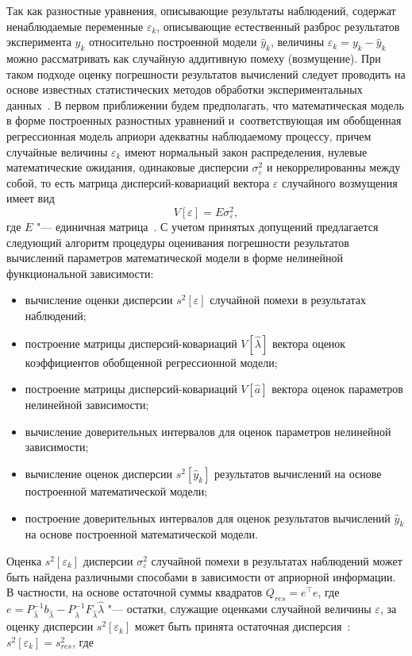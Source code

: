 Так как разностные уравнения, описывающие результаты наблюдений, содержат ненаблюдаемые переменные $\varepsilon_k$, описывающие естественный разброс результатов эксперимента $y_k$ относительно построенной модели $\hat{y}_k$,  величины $\varepsilon_k=y_k-\hat{y}_k$ можно рассматривать как случайную аддитивную помеху (возмущение). При таком подходе оценку погрешности результатов вычислений следует проводить на основе известных статистических методов обработки экспериментальных данных~\cite{zot:1,zot:2,zot:3}. В первом приближении будем предполагать, что математическая модель в форме построенных разностных уравнений и~соответствующая им обобщенная регрессионная модель априори адекватны наблюдаемому процессу, причем случайные величины $\varepsilon_k$ имеют нормальный закон распределения, нулевые математические ожидания, одинаковые дисперсии $\sigma_\varepsilon^2$ и некоррелированны между собой, то есть матрица дисперсий-ковариаций вектора $\varepsilon$ случайного возмущения имеет вид $$V[\varepsilon]=E\sigma_\varepsilon^2,$$ 
где   $E$ "--- единичная матрица~\cite{zot:1}. С учетом принятых допущений предлагается следующий алгоритм процедуры оценивания погрешности результатов вычислений параметров математической модели в форме нелинейной функциональной зависимости:

\begin{itemize}
\item 	вычисление оценки дисперсии $s^2[\varepsilon]$ случайной помехи в результатах наблюдений;
\item 	построение матрицы дисперсий-ковариаций $V[\hat{\lambda}]$ вектора оценок коэффициентов обобщенной регрессионной модели;
\item 	построение матрицы дисперсий-ковариаций $V[\hat{a}]$  вектора оценок параметров нелинейной зависимости;
\item	вычисление доверительных интервалов для оценок параметров нелинейной зависимости;
\item	вычисление оценок дисперсии $s^2[\hat{y}_k]$ результатов вычислений на основе построенной математической модели;
\item 	построение доверительных интервалов для оценок результатов вычислений $\hat{y}_k$ на основе построенной математической модели.
\end{itemize}

Оценка $s^2[\varepsilon_k]$ дисперсии $\sigma_\varepsilon^2$ случайной помехи в результатах наблюдений может быть найдена различными способами в зависимости от априорной информации. В частности, на основе остаточной суммы квадратов $Q_{res}=e^{\top}e$, где $e=P_{\hat{\lambda}}^{-1}b_{\hat{\lambda}}-P_{\hat{\lambda}}^{-1}F_{\hat{\lambda}} \hat{\lambda}$ "--- остатки, служащие оценками случайной величины $\varepsilon$, за оценку дисперсии $s^2[\varepsilon_k]$ может быть принята остаточная дисперсия~\cite{zot:1}: $s^2[\varepsilon_k]=s_{res}^2$, где 


